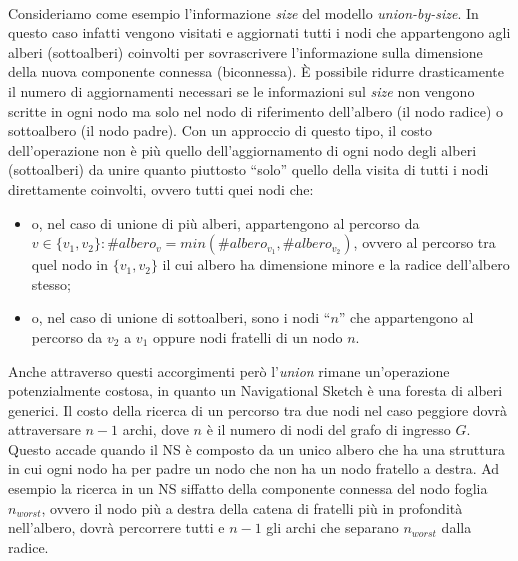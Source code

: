 \documentclass[a4paper,11pt]{report}
\begin{document}
\paragraph{}
Consideriamo come esempio l'informazione \emph{size} del modello \emph{union-by-size}. 
In questo caso infatti vengono visitati e aggiornati tutti i nodi
che appartengono agli alberi (sottoalberi) coinvolti per sovrascrivere l'informazione sulla dimensione della nuova componente connessa
(biconnessa). È possibile ridurre drasticamente il
numero di aggiornamenti necessari se le informazioni sul \emph{size} non vengono scritte in ogni nodo ma solo nel nodo di riferimento
dell'albero (il nodo radice) o sottoalbero 
(il nodo padre).
 Con un approccio di questo tipo, il costo dell'operazione non è più quello dell'aggiornamento di ogni nodo degli alberi (sottoalberi) da
unire quanto piuttosto 
``solo'' quello della visita di tutti i nodi direttamente coinvolti, ovvero tutti quei nodi che:
\begin{itemize}
 \item o, nel caso di unione di più alberi, appartengono al percorso da $v\in \{v_1,v_2\}:
\#albero_v=min\left(\#albero_{v_1},\#albero_{v_2}\right)$, ovvero al percorso tra quel nodo 
in $\{v_1,v_2\}$ il cui 
albero ha dimensione minore e la radice dell'albero stesso;
 \item o, nel caso di unione di sottoalberi, sono i nodi ``$n$'' che appartengono al percorso da $v_2$ a $v_1$ oppure nodi fratelli di un
nodo $n$.
\end{itemize}
Anche attraverso questi accorgimenti però l'\emph{union} rimane un'operazione potenzialmente costosa, in quanto un Navigational Sketch è una
foresta di alberi generici.
Il costo della ricerca di un percorso tra due nodi nel caso peggiore dovrà attraversare $n-1$ archi, dove $n$ è il numero di nodi del grafo
di ingresso $G$. Questo accade quando
il NS è composto da un unico albero che ha una struttura in cui ogni nodo ha per padre un nodo che non ha un nodo fratello a destra. Ad
esempio la ricerca in un NS siffatto 
della componente connessa del nodo foglia $n_{worst}$, ovvero il nodo più a destra della catena di fratelli più in profondità nell'albero,
dovrà percorrere tutti e $n-1$ gli archi
che separano $n_{worst}$ dalla radice.
\paragraph{}
\end{document}
